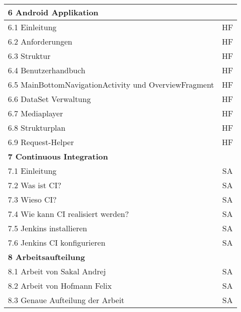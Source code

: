 \begin{longtable}{| l | l | c |}
\multicolumn{3}{|l|}{\textbf{6 Android Applikation}} \\ \hline
\multicolumn{2}{|l|}{6.1 Einleitung} & HF \\
\multicolumn{2}{|l|}{6.2 Anforderungen} & HF \\
\multicolumn{2}{|l|}{6.3 Struktur} & HF \\
\multicolumn{2}{|l|}{6.4 Benutzerhandbuch} & HF \\
\multicolumn{2}{|l|}{6.5 MainBottomNavigationActivity und OverviewFragment} & HF \\
\multicolumn{2}{|l|}{6.6 DataSet Verwaltung} & HF \\
\multicolumn{2}{|l|}{6.7 Mediaplayer} & HF \\
\multicolumn{2}{|l|}{6.8 Strukturplan} & HF \\
\multicolumn{2}{|l|}{6.9 Request-Helper} & HF \\ \hline

\multicolumn{3}{|l|}{\textbf{7 Continuous Integration}} \\ \hline
\multicolumn{2}{|l|}{7.1 Einleitung} & SA \\
\multicolumn{2}{|l|}{7.2 Was ist CI?} & SA \\
\multicolumn{2}{|l|}{7.3 Wieso CI?} & SA \\
\multicolumn{2}{|l|}{7.4 Wie kann CI realisiert werden?} & SA \\
\multicolumn{2}{|l|}{7.5 Jenkins installieren} & SA \\
\multicolumn{2}{|l|}{7.6 Jenkins CI konfigurieren} & SA \\ \hline

\multicolumn{3}{|l|}{\textbf{8 Arbeitsaufteilung}} \\ \hline
\multicolumn{2}{|l|}{8.1 Arbeit von Sakal Andrej} & SA \\
\multicolumn{2}{|l|}{8.2 Arbeit von Hofmann Felix} & SA \\
\multicolumn{2}{|l|}{8.3 Genaue Aufteilung der Arbeit} & SA \\ \hline
\end{longtable}

